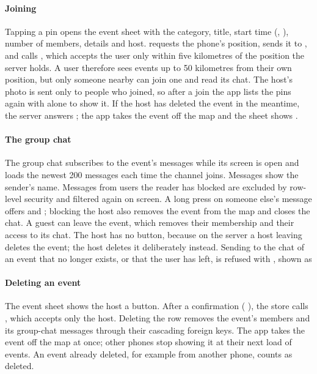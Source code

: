 \paragraph{Joining} Tapping a pin opens the event sheet with the category, title, start time
(, ), number of members, details and host.  requests the phone's position, sends it to , and calls ,
which accepts the user only within five kilometres of the position the server holds. A user therefore
sees events up to 50 kilometres from their own position, but only someone nearby can join one and read
its chat. The host's photo is sent only to people who joined, so after a join the app lists the pins
again with  alone to show it. If the host has deleted the event in the meantime, the server
answers ; the app takes the event off the map and the sheet shows .

\paragraph{The group chat} The group chat subscribes to the event's messages while its screen is open and
loads the newest 200 messages each time the channel joins. Messages show the sender's name. Messages from
users the reader has blocked are excluded by row-level security and filtered again on screen. A long press
on someone else's message offers  and ; blocking the host also removes the event from
the map and closes the chat. A guest can leave the event, which removes their membership and their access
to its chat. The host has no  button, because on the server a host leaving deletes the event;
the host deletes it deliberately instead. Sending to the chat of an event that no longer exists, or that
the user has left, is refused with , shown as 

\paragraph{Deleting an event} The event sheet shows the host a  button. After a
confirmation ( ), the store
calls , which accepts only the host. Deleting the row removes the event's members and
its group-chat messages through their cascading foreign keys. The app takes the event off the map at once;
other phones stop showing it at their next load of events. An event already deleted, for example from
another phone, counts as deleted.

